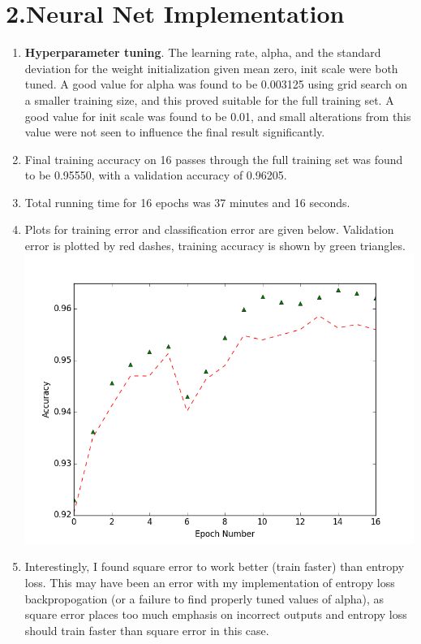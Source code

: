 \documentclass[11pt]{article}
\newenvironment{qparts}{\begin{enumerate}[{(}a{)}]}{\end{enumerate}}
\begin{document}
\section*{2.Neural Net Implementation}
\begin{qparts}
\item \textbf{Hyperparameter tuning}. The learning rate, alpha, and the standard deviation for the weight initialization given mean zero, init scale were both tuned. A good value for alpha was found to be 0.003125 using grid search on a smaller training size, and this proved suitable for the full training set. A good value for init scale was found to be 0.01, and small alterations from this value were not seen to influence the final result significantly. 

\item Final training accuracy on 16 passes through the full training set was found to be 0.95550, with a validation accuracy of 0.96205.

\item Total running time for 16 epochs was 37 minutes and 16 seconds.

\item Plots for training error and classification error are given below. Validation error is plotted by red dashes, training accuracy is shown by green triangles.
\newline
\includegraphics{16_epochs_full_square}

\item Interestingly, I found square error to work better (train faster) than entropy loss. This may have been an error with my implementation of entropy loss backpropogation (or a failure to find properly tuned values of alpha), as square error places too much emphasis on incorrect outputs and entropy loss should train faster than square error in this case.


\end{qparts}
\newpage
\end{document}

